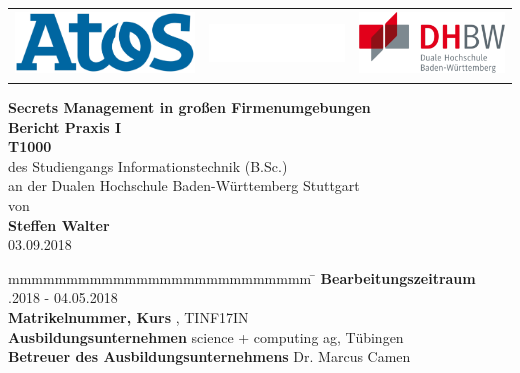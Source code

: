 \documentclass[
book,
a4paper,   
titlepage,  
halfparskip,
12pt        
]{scrartcl}
\begin{document}

\begin{titlepage}
\begin{longtable}{lcr}
{\includegraphics[height=1.7cm]{logo}} &
{\includegraphics[height=1.05cm]{blank}} &
{\includegraphics[height=1.7cm]{dhbw}}
\end{longtable}
\bigskip
\bigskip
\begin{center}
\vspace*{12mm} {\LARGE\bf Secrets Management in großen Firmenumgebungen}\\
\vspace*{12mm} {\large\bf Bericht Praxis I}\\
\vspace*{3mm} {\large\bf T1000}\\
\vspace*{12mm} des Studiengangs Informationstechnik (B.Sc.)\\ an der Dualen Hochschule Baden-Württemberg Stuttgart\\
\vspace*{12mm} von\\
\vspace*{3mm} {\large\bf Steffen Walter}\\
\vspace*{12mm} 03.09.2018\\
\end{center}
\vfill
\begin{spacing}{1.5}
\begin{tabbing}
mmmmmmmmmmmmmmmmmmmmmmmmmm \= \kill
\textbf{Bearbeitungszeitraum} .2018 - 04.05.2018\\
\textbf{Matrikelnummer, Kurs} , TINF17IN\\
\textbf{Ausbildungsunternehmen} \> science + computing ag, Tübingen\\
\textbf{Betreuer des Ausbildungsunternehmens} \>Dr. Marcus Camen\\
\end{tabbing}
\end{spacing}
\end{titlepage}
\end{document}
